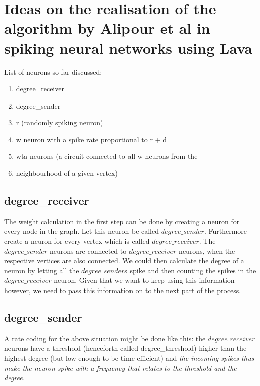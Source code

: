 \chapter{Ideas on the realisation of the algorithm by Alipour et al
in spiking neural networks using Lava}\label{chap:ideas_v1}
List of neurons so far discussed:
\begin{enumerate}
    \item degree\_receiver
    \item degree\_sender
    \item r (randomly spiking neuron)
    \item w neuron with a spike rate proportional to r + d
    \item wta neurons (a circuit connected to all w neurons from the
    \item neighbourhood of a given vertex)
\end{enumerate}

\section{degree\_receiver}\label{sec:degree_receiver}
The weight calculation in the first step can be done by creating a neuron for
every node in the graph. Let this neuron be called $degree\_sender$. Furthermore
create a neuron for every vertex which is called $degree\_receiver$. The
$degree\_sender$ neurons are connected to $degree\_receiver$ neurons, when the
respective vertices are also connected. We could then calculate the degree of a
neuron by letting all the $degree\_sender$s spike and then counting the spikes in
the $degree\_receiver$ neuron. Given that we want to keep using this information
however, we need to pass this information on to the next part of the process.

\section{degree\_sender}\label{sec:degree_sender}
A rate coding for the above situation might be done like this: the
$degree\_receiver$ neurons have a threshold (henceforth called
degree\_threshold) higher than the highest degree (but low enough to be time
efficient) and \textit{the incoming spikes thus make the neuron spike with a frequency
that relates to the threshold and the degree.}
